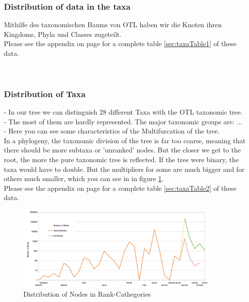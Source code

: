       \subsubsection{Distribution of data in the taxa}
        Mithilfe des taxonomischen Baums von OTL haben wir die Knoten ihren Kingdoms, Phyla und Classes 
          zugeteilt. \\
        Please see the appendix on page \pageref{sec:taxaTable1} for a complete table \ref{sec:taxaTable1} 
          of these data. \\
         \\
         \\

      \subsubsection{Distribution of Taxa}
        - In our tree we can distinguish 28 different Taxa with the OTL taxonomic tree. \\
        - The most of them are hardly represented. The major taxonomic groups are: ... \\
        - Here you can see some characteristics of the Multifurcation of the tree. \\
        In a phylogeny, the taxonomic division of the tree is far too coarse, meaning that there should 
          be more subtaxa or 'unranked' nodes. But the closer we get to the root, the more the pure
          taxonomic tree is reflected. If the tree were binary, the taxa would have to double. But the 
          multipliers for some are much bigger and for others much smaller, which you can see in in figure 
          \ref{fig:taxaTable2}. \\
        Please see the appendix on page \pageref{sec:taxaTable2} for a complete table \ref{sec:taxaTable2} 
          of these data. \\
        \begin{figure}
          \centering
          \includegraphics[width=0.9\textwidth]{Figures/TaxaTable2.JPG}
          \caption{Distribution of Nodes in Rank-Cathegories}
          \label{fig:taxaTable2}
        \end{figure}

